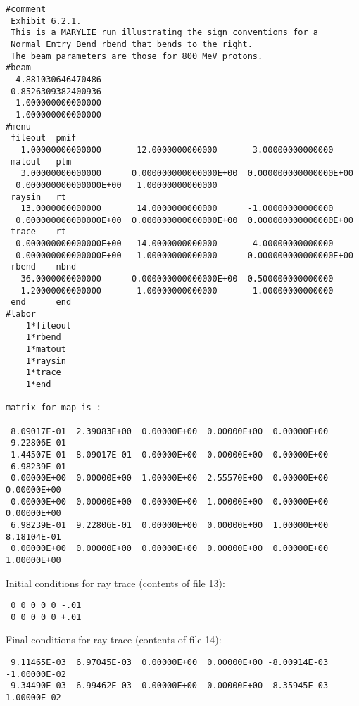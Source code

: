 \clearpage
\begin{footnotesize}
\begin{verbatim}
#comment
 Exhibit 6.2.1.
 This is a MARYLIE run illustrating the sign conventions for a
 Normal Entry Bend rbend that bends to the right.
 The beam parameters are those for 800 MeV protons.
#beam
  4.881030646470486
 0.8526309382400936
  1.000000000000000
  1.000000000000000
#menu
 fileout  pmif
   1.00000000000000       12.0000000000000       3.00000000000000
 matout   ptm
   3.00000000000000      0.000000000000000E+00  0.000000000000000E+00
  0.000000000000000E+00   1.00000000000000
 raysin   rt
   13.0000000000000       14.0000000000000      -1.00000000000000
  0.000000000000000E+00  0.000000000000000E+00  0.000000000000000E+00
 trace    rt
  0.000000000000000E+00   14.0000000000000       4.00000000000000
  0.000000000000000E+00   1.00000000000000      0.000000000000000E+00
 rbend    nbnd
   36.0000000000000      0.000000000000000E+00  0.500000000000000
   1.20000000000000       1.00000000000000       1.00000000000000
 end      end
#labor
    1*fileout
    1*rbend
    1*matout
    1*raysin
    1*trace
    1*end

matrix for map is :

 8.09017E-01  2.39083E+00  0.00000E+00  0.00000E+00  0.00000E+00 -9.22806E-01
-1.44507E-01  8.09017E-01  0.00000E+00  0.00000E+00  0.00000E+00 -6.98239E-01
 0.00000E+00  0.00000E+00  1.00000E+00  2.55570E+00  0.00000E+00  0.00000E+00
 0.00000E+00  0.00000E+00  0.00000E+00  1.00000E+00  0.00000E+00  0.00000E+00
 6.98239E-01  9.22806E-01  0.00000E+00  0.00000E+00  1.00000E+00  8.18104E-01
 0.00000E+00  0.00000E+00  0.00000E+00  0.00000E+00  0.00000E+00  1.00000E+00
\end{verbatim}
\end{footnotesize}
Initial conditions for ray trace (contents of file 13):
\begin{footnotesize}
\begin{verbatim}
 0 0 0 0 0 -.01
 0 0 0 0 0 +.01
\end{verbatim}
\end{footnotesize}
Final conditions for ray trace (contents of file 14):
\begin{footnotesize}
\begin{verbatim}
 9.11465E-03  6.97045E-03  0.00000E+00  0.00000E+00 -8.00914E-03 -1.00000E-02
-9.34490E-03 -6.99462E-03  0.00000E+00  0.00000E+00  8.35945E-03  1.00000E-02
\end{verbatim}
\end{footnotesize}

